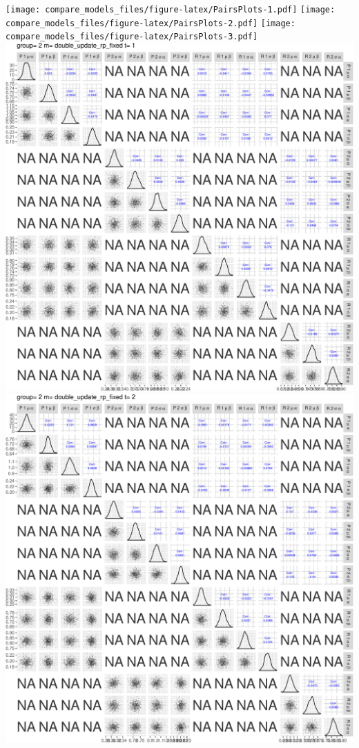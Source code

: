 \documentclass[]{article}
\begin{document}
\texttt{[image: compare\_models\_files/figure-latex/PairsPlots-1.pdf]}
\texttt{[image: compare\_models\_files/figure-latex/PairsPlots-2.pdf]}
\texttt{[image: compare\_models\_files/figure-latex/PairsPlots-3.pdf]}
\includegraphics{compare_models_files/figure-latex/PairsPlots-4.pdf}
\includegraphics{compare_models_files/figure-latex/PairsPlots-5.pdf}
\end{document}

